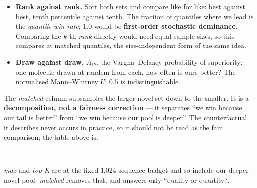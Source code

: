 \documentclass[11pt]{article}
\begin{document}
\begin{itemize}
  \item \textbf{Rank against rank.} Sort both sets and compare like for like:
        best against best, tenth percentile against tenth. The fraction of
        quantiles where we lead is the \emph{quantile win rate}; 1.0 would be
        \textbf{first-order stochastic dominance}. Comparing the $k$-th
        \emph{rank} directly would need equal sample sizes, so this compares at
        matched quantiles, the size-independent form of the same idea.
  \item \textbf{Draw against draw.} $A_{12}$, the Vargha--Delaney probability of
        superiority: one molecule drawn at random from each, how often is ours
        better? The normalised Mann--Whitney $U$; $0.5$ is indistinguishable.
\end{itemize}

The \emph{matched} column subsamples the larger novel set down to the smaller.
It is a \textbf{decomposition, not a fairness correction} --- it separates
``we win because our tail is better'' from ``we win because our pool is deeper''.
The counterfactual it describes never occurs in practice, so it should not be
read as the fair comparison; the table above is.

\begin{table}[htbp]
\centering
\small
{}
\\[0.4em] \begin{minipage}{0.92\textwidth}\footnotesize \emph{max} and \emph{top-K} are at the fixed 1,024-sequence budget and so include our deeper novel pool. \emph{matched} removes that, and answers only ``quality or quantity?.\end{minipage}
\caption{Each method at its own best setting by top-10. \emph{q-win} and $A_{12}$ sit on the ours row and describe ours against D-CBG.}
\label{tab:beyond-qed}
\end{table}
\end{document}

